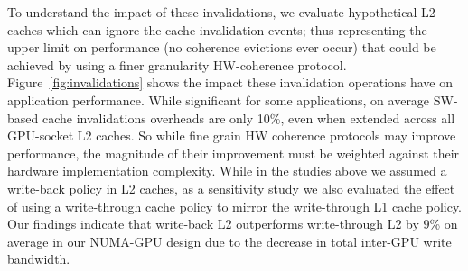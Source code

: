 To understand the impact of these invalidations, we evaluate hypothetical L2 caches which can ignore the cache 
invalidation events; thus representing
the upper limit on performance (no coherence evictions ever occur) that could be achieved by 
using a finer granularity HW-coherence protocol.
Figure~\ref{fig:invalidations} shows the impact these invalidation
operations have on application performance.
While significant for
some applications, on average SW-based cache invalidations overheads are only 10\%, even
when extended across all GPU-socket L2 caches.  So while fine grain HW coherence protocols
may improve performance, the magnitude of their improvement must be weighted against their
hardware implementation complexity. While in the studies above we assumed a write-back policy in L2 caches, as a sensitivity study we also evaluated the effect of using a write-through cache policy to mirror the write-through L1 cache policy. Our findings indicate that write-back L2 outperforms write-through L2 by 9\% on average in our NUMA-GPU design due to the decrease in total inter-GPU write bandwidth.
